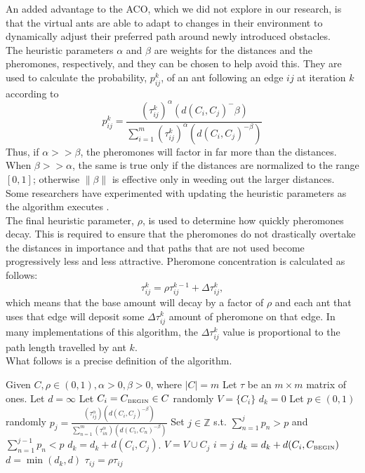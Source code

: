\documentclass[twocolumn]{article}
\begin{document}
An added advantage to the ACO, which we did not explore in our research, is that
the virtual ants are able to adapt to changes in their environment to 
dynamically adjust their preferred path around newly introduced obstacles. \\

The heuristic parameters $\alpha$ and $\beta$ are weights for the distances and 
the pheromones, respectively, and they can be chosen to help avoid this. They 
are used to calculate the probability, $p^k_{ij}$, of an ant following an edge
$ij$ at iteration $k$ according to 
\[ p_{ij}^k = \frac{(\tau^k_{ij})^\alpha(d(C_i,C_j)^-\beta)}{\sum_{i=1}^m 
  (\tau^k_{ij})^\alpha(d(C_i,C_j)^{-\beta})} \]
Thus, if $\alpha >> \beta$, the pheromones will factor in far more than the
distances. When $\beta >> \alpha$, the same is true only if the distances are 
normalized to the range $[0,1]$; otherwise $\|\beta\|$ is effective only in 
weeding out the larger distances. Some researchers have experimented with 
updating the heuristic parameters as the algorithm executes \cite{ipcsit:aco}.\\

The final heuristic parameter, $\rho$, is used to 
determine how quickly pheromones decay. This is required to ensure that the pheromones do not
drastically overtake the distances in importance and that paths that are not used become 
progressively less and less attractive. Pheromone concentration is calculated as follows:
\[ \tau^k_{ij} = \rho \tau^{k-1}_{ij} + \Delta \tau^k_{ij}, \]
which means that the base amount will decay by a factor of $\rho$ and each ant
that uses that edge will deposit some $\Delta\tau^k_{ij}$ amount of pheromone on
that edge. In many implementations of this algorithm, the $\Delta\tau^k_{ij}$
value is proportional to the path length travelled by ant $k$. \\ %

What follows is a precise definition of the algorithm. \\

\begin{algorithmic}
  \State Given $C, \rho \in (0,1), \alpha > 0, \beta > 0$, where $|C| = m$
  \State Let $\tau$ be an $m \times m$ matrix of ones.
  \State Let $d = \infty$
    \State Let $C_i = C_{\mbox{{\tiny BEGIN}}}\in C$ randomly
    \State $V = \{ C_i \}$
    \State $d_k = 0$
       \State Let $p \in (0,1)$ randomly
       \State $\displaystyle p_j = \frac{(\tau_{ij}^\alpha)(d(C_i,C_j)^{-\beta})}{\sum_{n=1}^m 
         (\tau_{in}^\alpha) (d(C_i,C_n)^{-\beta})}$
       \State Set $j \in \mathbb{Z}$ s.t. $\displaystyle \sum_{n=1}^j p_n > p$ and 
       $\displaystyle \sum_{n=1}^{j-1} p_n < p$
       \State $d_k = d_k + d(C_i,C_j)$.
       \State $V = V \cup C_j$
       \State $i = j$
    \EndWhile
    \State $d_k = d_k + d(C_i,C_{\mbox{{\tiny BEGIN}}})$
    \State $d = \min (d_k, d)$
    \State $\tau_{ij} = \rho \tau_{ij}$
  \EndFor \\
\end{algorithmic}
\end{document}
